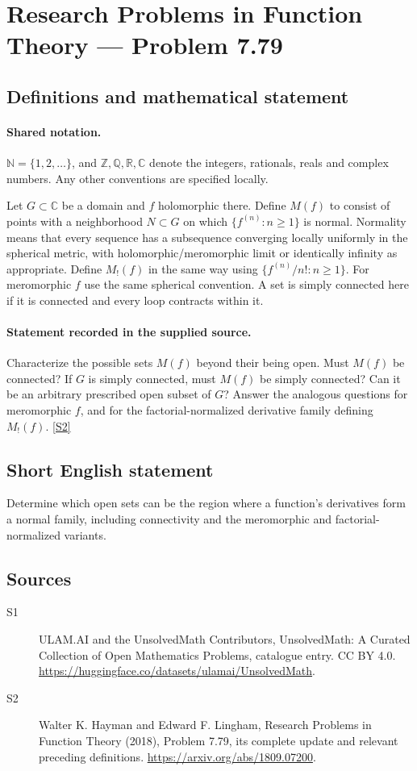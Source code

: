 \documentclass[11pt]{article}
\newcommand{\sref}[2]{\hyperlink{source:#1:#2}{[S#2]}}
\begin{document}
\section{Research Problems in Function Theory — Problem 7.79}\label{statement}

\subsection{Definitions and mathematical statement}

\paragraph{Shared notation.}$\mathbb N=\{1,2,\ldots\}$, and $\mathbb Z,\mathbb Q,\mathbb R,\mathbb C$ denote the integers, rationals, reals and complex numbers. Any other conventions are specified locally.


Let $G\subset\mathbb C$ be a domain and $f$ holomorphic there. Define $M(f)$ to consist of points with a neighborhood $N\subset G$ on which $\{f^{(n)}:n\ge1\}$ is normal. Normality means that every sequence has a subsequence converging locally uniformly in the spherical metric, with holomorphic/meromorphic limit or identically infinity as appropriate. Define $M_!(f)$ in the same way using $\{f^{(n)}/n!:n\ge1\}$. For meromorphic $f$ use the same spherical convention. A set is simply connected here if it is connected and every loop contracts within it.
\paragraph{Statement recorded in the supplied source.}
Characterize the possible sets $M(f)$ beyond their being open. Must $M(f)$ be connected? If $G$ is simply connected, must $M(f)$ be simply connected? Can it be an arbitrary prescribed open subset of $G$? Answer the analogous questions for meromorphic $f$, and for the factorial-normalized derivative family defining $M_!(f)$. \sref{statement}{2}
\subsection{Short English statement}
Determine which open sets can be the region where a function’s derivatives form a normal family, including connectivity and the meromorphic and factorial-normalized variants.
\subsection{Sources}
\begin{description}
\item[\hypertarget{source:statement:1}{S1}] ULAM.AI and the UnsolvedMath Contributors, UnsolvedMath: A Curated Collection of Open Mathematics Problems, catalogue entry. CC BY 4.0. \url{https://huggingface.co/datasets/ulamai/UnsolvedMath}.
\item[\hypertarget{source:statement:2}{S2}] Walter K. Hayman and Edward F. Lingham, Research Problems in Function Theory (2018), Problem 7.79, its complete update and relevant preceding definitions. \url{https://arxiv.org/abs/1809.07200}.
\end{description}
\label{end:statement}
\end{document}
